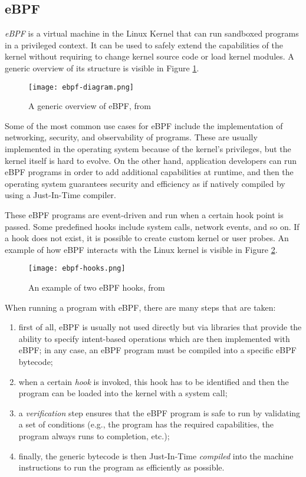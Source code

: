 \subsection{eBPF}
\textit{eBPF} \cite{ebpf} is a virtual machine in the Linux Kernel that can run sandboxed programs
in a privileged context. It can be used to safely extend the capabilities of the kernel
without requiring to change kernel source code or load kernel modules. A generic overview of its structure
is visible in Figure \ref{fig:ebpf-generic-overview}.

\begin{figure}[h]
  \centering
  \texttt{[image: ebpf-diagram.png]}
  \caption{A generic overview of eBPF, from \cite{ebpf}}
  \label{fig:ebpf-generic-overview}
\end{figure}

Some of the most common use cases for eBPF include the implementation of networking, security, and
observability of programs. These are usually implemented in the operating system because of the kernel's
privileges, but the kernel itself is hard to evolve.
On the other hand, application developers can run eBPF programs in order to add additional capabilities at runtime,
and then the operating system guarantees security and efficiency as if natively compiled
by using a Just-In-Time compiler.

These eBPF programs are event-driven and run when a certain hook point is passed. Some
predefined hooks include system calls, network events, and so on. If a hook does not exist,
it is possible to create custom kernel or user probes. An example of how eBPF interacts with the
Linux kernel is visible in Figure \ref{fig:example-ebpf-hooks}.

\begin{figure}[h]
  \centering
  \texttt{[image: ebpf-hooks.png]}
  \caption{An example of two eBPF hooks, from \cite{ebpf-description}}
  \label{fig:example-ebpf-hooks}
\end{figure}

When running a program with eBPF, there are many steps that are taken:
\begin{enumerate}
  \item first of all, eBPF is usually not used directly but via libraries that provide the ability to specify
        intent-based operations which are then implemented with eBPF; in any case, an eBPF program must be
        compiled into a specific eBPF bytecode;
  \item when a certain \textit{hook} is invoked, this hook has to be identified and then the program can be loaded
        into the kernel with a system call;
  \item a \textit{verification} step ensures that the eBPF program is safe to run by validating a set of conditions
        (e.g., the program has the required capabilities, the program always runs to completion, etc.);
  \item finally, the generic bytecode is then Just-In-Time \textit{compiled} into the machine instructions
        to run the program as efficiently as possible.
\end{enumerate}

